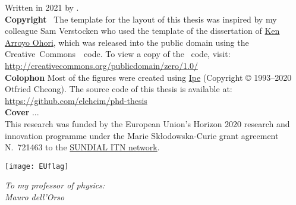 \clearpage
\thispagestyle{empty}
\null%
\label{thesis:colophon}
\vfill
{}
\noindent Written in 2021 by {\makeatletter{\@author}\makeatother}.\\
\textbf{Copyright}~\cczero{} The template for the layout of this thesis was inspired by my colleague Sam Verstocken who used the template of the dissertation of \href{ken.mx}{Ken Arroyo Ohori},
which was released into the public domain using the Creative~Commons~\cczero{}~code.
To view a copy of the \cczero{}~code, visit:\\\url{http://creativecommons.org/publicdomain/zero/1.0/}\\
\textbf{Colophon}
Most of the figures were created using \href{http://ipe.otfried.org/}{Ipe} (Copyright © 1993–2020 Otfried Cheong).
The source code of this thesis is available at: \\
\url{https://github.com/elehcim/phd-thesis}\\
\textbf{Cover}
...\\[2ex]
This research was funded by the European Union's Horizon 2020 research and innovation programme under the Marie Sk\l odowska-Curie
grant agreement N.~721463 to the \href{www.astro.rug.nl/~sundial}{SUNDIAL ITN network}.
\begin{figure*}[bh!]
  \centering
  \texttt{[image: EUflag]}
\end{figure*}

\clearpage
\thispagestyle{empty}
\null%
\vfill
\begin{flushright}
  \textit{To my professor of physics:\\
      Mauro dell'Orso\\
      }
\end{flushright}
\vfill


